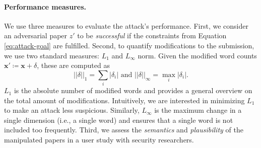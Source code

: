 \documentclass[letterpaper,twocolumn,10pt]{article}
\newcommand{\bow}{\textbf{x}}
\newcommand{\submission}{\bow}
\newcommand{\modifications}{\delta}
\newcommand{\modificationsmannorm}{{\left| \left| \modifications \right| \right|}_1}
\newcommand{\modificationsinfnorm}{{\left| \left| \modifications \right| \right|}_\infty}
\newcommand{\inputpdf}{\ensuremath{z}\xspace}
\begin{document}
\paragraph{Performance measures.} We use three measures to evaluate the attack's performance. First, we consider an adversarial paper $\inputpdf'$ to be \emph{successful} if the constraints from Equation \ref{eq:attack-goal} are fulfilled.
Second, to quantify modifications to the submission, we use two standard measures: $L_1$ and $L_\infty$ norm. Given the modified word counts $\submission' \coloneqq \submission + \modifications $, these are computed as
	\begin{equation}
	   \modificationsmannorm = \sum_{i}{\left| \modifications_i \right|} \text{ and } \modificationsinfnorm = \max_i \left| \modifications_i \right|.
	\end{equation}
$L_1$ is the absolute number of modified words and provides a general overview on the total amount of modifications. Intuitively, we are interested in minimizing $L_1$ to make an attack less suspicious. Similarly, $L_\infty$ is the maximum change in a single dimension (i.e., a single word) and ensures that a single word is not included too frequently. 
Third, we assess the \emph{semantics} and \emph{plausibility} of the manipulated papers in a user study with security researchers.
\end{document}
